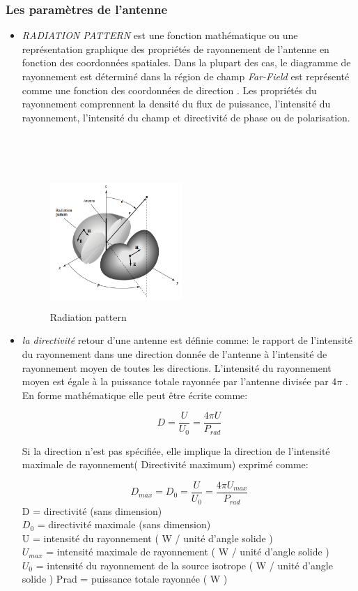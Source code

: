 \documentclass[11pt, a4paper, twoside]{book}
\begin{document}
\subsubsection{Les paramètres de l'antenne}
\begin{itemize}
\item \emph{RADIATION PATTERN} est une fonction mathématique ou une représentation graphique des propriétés de rayonnement de l'antenne en fonction des coordonnées spatiales. Dans la plupart des cas, le diagramme de rayonnement est déterminé dans la région de champ \emph{Far-Field} est représenté comme une fonction des coordonnées de direction . Les propriétés du rayonnement comprennent la densité du flux de puissance, l'intensité du rayonnement, l'intensité du champ et directivité de phase ou de polarisation.\\\\\\\\
\begin{figure}[H]
\centering
\includegraphics[width=5cm,height=5cm]{radpa}
\caption{Radiation pattern}
\end{figure}
\item \emph{la directivité} retour d'une antenne est définie comme: le rapport de l'intensité du rayonnement dans une direction donnée de l'antenne à l'intensité de rayonnement moyen de toutes les directions. L'intensité du rayonnement moyen est égale à la puissance totale rayonnée par l'antenne divisée par 4\(\pi\) . En forme mathématique elle peut être écrite comme:

\begin{equation}
D = \dfrac{U}{U_{0}} = \dfrac{4 \pi U}{P_{rad}}
\end{equation}

Si la direction n'est pas spécifiée, elle implique la direction de l'intensité maximale de rayonnement( Directivité maximum) exprimé comme:

\begin{equation}
D_{max} = D_{0} = \dfrac{U}{U_{0}} = \dfrac{4 \pi U_{max}}{P_{rad}}
\end{equation}
D = directivité (sans dimension)\\
\(D_{0}\) = directivité maximale (sans dimension)\\
U = intensité du rayonnement ( W / unité d'angle solide )\\
\(U_{max}\) = intensité maximale de rayonnement ( W / unité d'angle solide )\\
\(U_{0}\) = intensité du rayonnement de la source isotrope ( W / unité d'angle solide ) Prad = puissance totale rayonnée ( W )\\


\end{itemize}
\end{document}
